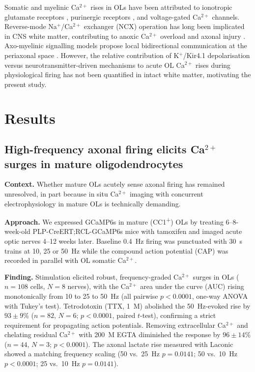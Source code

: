 \documentclass[11pt,a4paper]{article}
\begin{document}
Somatic and myelinic Ca$^{2+}$ rises in OLs have been attributed to ionotropic glutamate receptors \citep{Micu2006,Saab2016}, purinergic receptors \citep{Kettenmann2013}, and voltage-gated Ca$^{2+}$ channels. Reverse-mode Na$^+$/Ca$^{2+}$ exchanger (NCX) operation has long been implicated in CNS white matter, contributing to anoxic Ca$^{2+}$ overload and axonal injury \citep{Stys1992,Micu2018}. Axo-myelinic signalling models propose local bidirectional communication at the periaxonal space \citep{Micu2018}. However, the relative contribution of K$^+$/Kir4.1 depolarisation versus neurotransmitter-driven mechanisms to acute OL Ca$^{2+}$ rises during physiological firing has not been quantified in intact white matter, motivating the present study.

\section{Results}

\subsection{High-frequency axonal firing elicits Ca$^{2+}$ surges in mature oligodendrocytes}

\textbf{Context.} Whether mature OLs acutely sense axonal firing has remained unresolved, in part because in situ Ca$^{2+}$ imaging with concurrent electrophysiology in mature OLs is technically demanding.

\textbf{Approach.} We expressed GCaMP6s in mature (CC1\textsuperscript{+}) OLs by treating 6--8-week-old PLP-CreERT;RCL-GCaMP6s mice with tamoxifen and imaged acute optic nerves 4--12 weeks later. Baseline 0.4~Hz firing was punctuated with 30~s trains at 10, 25 or 50~Hz while the compound action potential (CAP) was recorded in parallel with OL somatic Ca$^{2+}$.

\textbf{Finding.} Stimulation elicited robust, frequency-graded Ca$^{2+}$ surges in OLs ($n=108$ cells, $N=8$ nerves), with the Ca$^{2+}$ area under the curve (AUC) rising monotonically from 10 to 25 to 50~Hz (all pairwise $p<0.0001$, one-way ANOVA with Tukey's test). Tetrodotoxin (TTX, 1~\textmu M) abolished the 50~Hz-evoked rise by $93 \pm 9\%$ ($n=82$, $N=6$; $p<0.0001$, paired $t$-test), confirming a strict requirement for propagating action potentials. Removing extracellular Ca$^{2+}$ and chelating residual Ca$^{2+}$ with 200~\textmu M EGTA diminished the response by $96 \pm 14\%$ ($n=44$, $N=3$; $p<0.0001$). The axonal lactate rise measured with Laconic showed a matching frequency scaling (50 vs.\ 25~Hz $p=0.0141$; 50 vs.\ 10~Hz $p<0.0001$; 25 vs.\ 10~Hz $p=0.0141$).
\end{document}
